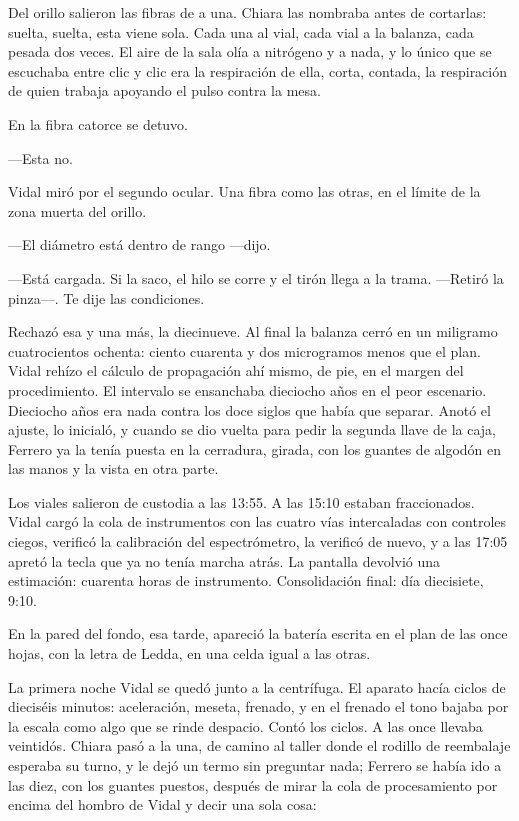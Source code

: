 Del orillo salieron las fibras de a una. Chiara las nombraba antes de cortarlas: suelta, suelta, esta viene sola. Cada una al vial, cada vial a la balanza, cada pesada dos veces. El aire de la sala olía a nitrógeno y a nada, y lo único que se escuchaba entre clic y clic era la respiración de ella, corta, contada, la respiración de quien trabaja apoyando el pulso contra la mesa.

En la fibra catorce se detuvo.

---Esta no.

Vidal miró por el segundo ocular. Una fibra como las otras, en el límite de la zona muerta del orillo.

---El diámetro está dentro de rango ---dijo.

---Está cargada. Si la saco, el hilo se corre y el tirón llega a la trama. ---Retiró la pinza---. Te dije las condiciones.

Rechazó esa y una más, la diecinueve. Al final la balanza cerró en un miligramo cuatrocientos ochenta: ciento cuarenta y dos microgramos menos que el plan. Vidal rehízo el cálculo de propagación ahí mismo, de pie, en el margen del procedimiento. El intervalo se ensanchaba dieciocho años en el peor escenario. Dieciocho años era nada contra los doce siglos que había que separar. Anotó el ajuste, lo inicialó, y cuando se dio vuelta para pedir la segunda llave de la caja, Ferrero ya la tenía puesta en la cerradura, girada, con los guantes de algodón en las manos y la vista en otra parte.

Los viales salieron de custodia a las 13:55. A las 15:10 estaban fraccionados. Vidal cargó la cola de instrumentos con las cuatro vías intercaladas con controles ciegos, verificó la calibración del espectrómetro, la verificó de nuevo, y a las 17:05 apretó la tecla que ya no tenía marcha atrás. La pantalla devolvió una estimación: cuarenta horas de instrumento. Consolidación final: día diecisiete, 9:10.

En la pared del fondo, esa tarde, apareció la batería escrita en el plan de las once hojas, con la letra de Ledda, en una celda igual a las otras.

La primera noche Vidal se quedó junto a la centrífuga. El aparato hacía ciclos de dieciséis minutos: aceleración, meseta, frenado, y en el frenado el tono bajaba por la escala como algo que se rinde despacio. Contó los ciclos. A las once llevaba veintidós. Chiara pasó a la una, de camino al taller donde el rodillo de reembalaje esperaba su turno, y le dejó un termo sin preguntar nada; Ferrero se había ido a las diez, con los guantes puestos, después de mirar la cola de procesamiento por encima del hombro de Vidal y decir una sola cosa:

